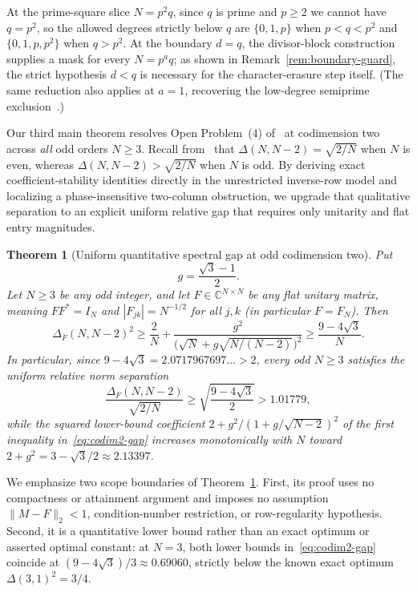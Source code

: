 \documentclass[11pt,reqno]{amsart}
\numberwithin{equation}{section}
\newtheorem{theorem}{Theorem}[section]
\theoremstyle{definition}
\theoremstyle{remark}
\newcommand{\C}{\mathbb{C}}
\begin{document}
At the prime-square slice $N=p^2 q$, since $q$ is prime and $p\ge 2$ we cannot have $q=p^2$, so the allowed degrees strictly below $q$ are $\{0,1,p\}$ when $p<q<p^2$ and $\{0,1,p,p^2\}$ when $q>p^2$. At the boundary $d=q$, the divisor-block construction~\cite[Section~2.1]{KKKKK26} supplies a mask for every $N=p^a q$; as shown in Remark~\ref{rem:boundary-guard}, the strict hypothesis $d<q$ is necessary for the character-erasure step itself. (The same reduction also applies at $a=1$, recovering the low-degree semiprime exclusion~\cite[Proposition~3.1]{KKKKK26}.)

Our third main theorem resolves Open Problem~(4) of~\cite{KKKKK26} at codimension two across \emph{all} odd orders $N\ge 3$. Recall from~\cite[Corollary~4.1(2)]{KKKKK26} that $\Delta(N,N-2)=\sqrt{2/N}$ when $N$ is even, whereas $\Delta(N,N-2)>\sqrt{2/N}$ when $N$ is odd. By deriving exact coefficient-stability identities directly in the unrestricted inverse-row model and localizing a phase-insensitive two-column obstruction, we upgrade that qualitative separation to an explicit uniform relative gap that requires only unitarity and flat entry magnitudes.

\begin{theorem}[Uniform quantitative spectral gap at odd codimension two]
\label{thm:odd-codim2}
Put
\begin{equation}
\label{eq:g-def}
g = \frac{\sqrt{3}-1}{2}.
\end{equation}
Let $N\ge 3$ be any odd integer, and let $F\in\C^{N\times N}$ be any flat unitary matrix, meaning $FF^*=I_N$ and $|F_{jk}|=N^{-1/2}$ for all $j,k$ (in particular $F=F_N$). Then
\begin{equation}
\label{eq:codim2-gap}
\Delta_F(N, N-2)^2
\ge \frac{2}{N} + \frac{g^2}{\bigl(\sqrt{N} + g\sqrt{N/(N-2)}\bigr)^2}
\ge \frac{9 - 4\sqrt{3}}{N}.
\end{equation}
In particular, since $9-4\sqrt{3}=2.0717967697\ldots>2$, every odd $N\ge 3$ satisfies the uniform relative norm separation
\begin{equation}
\label{eq:codim2-ratio}
\frac{\Delta_F(N,N-2)}{\sqrt{2/N}} \ge \sqrt{\frac{9-4\sqrt{3}}{2}} > 1.01779,
\end{equation}
while the squared lower-bound coefficient $2 + g^2/(1 + g/\sqrt{N-2})^2$ of the first inequality in~\eqref{eq:codim2-gap} increases monotonically with $N$ toward $2+g^2 = 3 - \sqrt{3}/2 \approx 2.13397$.
\end{theorem}

We emphasize two scope boundaries of Theorem~\ref{thm:odd-codim2}. First, its proof uses no compactness or attainment argument and imposes no assumption $\|M-F\|_2<1$, condition-number restriction, or row-regularity hypothesis. Second, it is a quantitative lower bound rather than an exact optimum or asserted optimal constant: at $N=3$, both lower bounds in~\eqref{eq:codim2-gap} coincide at $(9-4\sqrt{3})/3\approx 0.69060$, strictly below the known exact optimum $\Delta(3,1)^2=3/4$.
\end{document}
